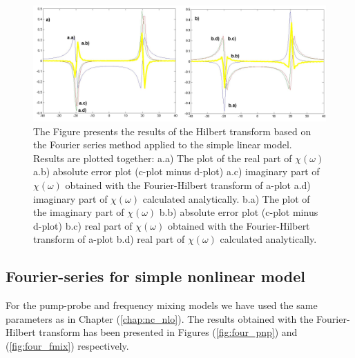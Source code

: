 \documentclass[12pt,twoside,a4paper]{article}
\numberwithin{equation}{subsection}
\numberwithin{figure}{subsection}
\begin{document}
\begin{figure} 
  \includegraphics[width=150mm]{img/four_lin.png}
  \caption{ The Figure presents the results of the Hilbert transform based on the Fourier series method applied to the simple linear model.
  Results are plotted together:
   a.a) The plot of the real part of $\chi (\omega )$ 
   a.b) absolute error plot (c-plot minus d-plot) 
   a.c) imaginary part of $\chi (\omega )$ obtained with the Fourier-Hilbert transform of a-plot 
   a.d) imaginary part of $\chi (\omega )$  calculated analytically. 
   b.a) The plot of the imaginary part of $\chi (\omega )$ 
   b.b) absolute error plot (c-plot minus d-plot) 
   b.c) real part of $\chi (\omega )$ obtained with the Fourier-Hilbert transform of a-plot 
   b.d) real part of $\chi (\omega )$ calculated analytically. \label{fig:four_lin}
  }
\end{figure} 

\subsection{Fourier-series for simple nonlinear model} \label{chap:fourier_nlo}

For the pump-probe and frequency mixing models we have used the same parameters as in Chapter (\ref{chap:nc_nlo}). The results
obtained with the Fourier-Hilbert transform has been presented in Figures (\ref{fig:four_pnp}) and (\ref{fig:four_fmix})
respectively.
\end{document}

